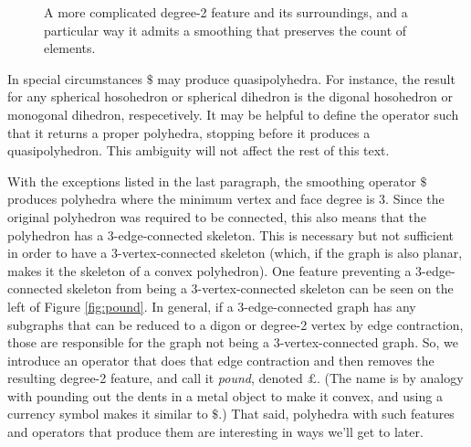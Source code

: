 \documentclass[12pt]{amsart}%
\begin{document}
\begin{figure}[!htbp]

\caption{A more complicated degree-2 feature and its surroundings,
and a particular way it admits a smoothing that preserves the count of
elements.}
\label{fig:weirdo}
\end{figure}

In special circumstances $\$$ may produce quasipolyhedra. For instance, the
result for any spherical hosohedron or spherical dihedron is the digonal
hosohedron or monogonal dihedron, respecetively. It may be helpful to define
the operator such that it returns a proper polyhedra,
stopping before it produces a quasipolyhedron.
This ambiguity will not affect the rest of this text.

With the exceptions listed in the last paragraph, the smoothing operator
$\$$ produces polyhedra where the minimum vertex and face degree is 3. Since
the original polyhedron was required to be connected, this also means that the
polyhedron has a 3-edge-connected skeleton. This is necessary but not
sufficient in order to have a 3-vertex-connected skeleton (which, if the graph
is also planar, makes it the skeleton of a convex polyhedron). One feature
preventing a 3-edge-connected skeleton from being a 3-vertex-connected skeleton
can be seen on the left of Figure \ref{fig:pound}. In general, if a
3-edge-connected graph has any subgraphs that can be reduced to a digon or
degree-2 vertex by edge contraction, those are responsible for the graph not
being a 3-vertex-connected graph. So, we introduce an operator that does that
edge contraction and then removes the resulting degree-2 feature, and call it
\textit{pound}, denoted $\pounds$. (The name is by analogy with pounding out
the dents in a metal object to make it convex, and using a currency symbol
makes it similar to $\$$.) That said, polyhedra with such features and
operators that produce them are interesting in ways we'll get to later.
\end{document}
